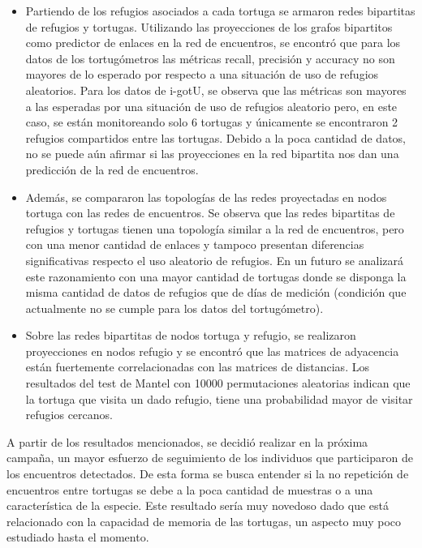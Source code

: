 \begin{itemize}
\item Partiendo de los refugios asociados a cada tortuga se armaron redes bipartitas de refugios y tortugas. Utilizando las proyecciones de los grafos bipartitos como predictor de enlaces en la red de encuentros, se encontró que para los datos de los tortugómetros las métricas recall, precisión y accuracy no son mayores de lo esperado por respecto a una situación de uso de refugios aleatorios. Para los datos de i-gotU, se observa que las métricas son mayores a las esperadas por  una situación de uso de refugios aleatorio pero, en este caso, se están monitoreando solo 6 tortugas y únicamente se encontraron 2 refugios compartidos entre las tortugas. Debido a la poca cantidad de datos, no se puede aún afirmar si las proyecciones en la red bipartita nos dan una predicción de la red de encuentros.
 
\item Además, se compararon las topologías de las redes proyectadas en nodos tortuga con las redes de encuentros. Se observa que las redes bipartitas de refugios y tortugas tienen una topología similar a la red de encuentros, pero con una menor cantidad de enlaces y tampoco presentan diferencias significativas respecto el uso aleatorio de refugios.  En un futuro se analizará este razonamiento con una mayor cantidad de tortugas donde se disponga la misma cantidad de datos de refugios que de días de medición (condición que actualmente no se cumple para los datos del tortugómetro).
 
\item Sobre las redes bipartitas de nodos tortuga y refugio, se realizaron proyecciones en nodos refugio y se encontró que las matrices de adyacencia están fuertemente correlacionadas con las matrices de distancias. Los resultados del test de Mantel con 10000 permutaciones aleatorias indican que la tortuga que visita un dado refugio, tiene una probabilidad mayor de visitar refugios cercanos.
 


\end{itemize}
 
 
 
A partir de los resultados mencionados, se decidió realizar en la próxima campaña, un mayor esfuerzo de seguimiento de los individuos que participaron de los encuentros  detectados. De esta forma se busca entender si la no repetición de encuentros entre tortugas se debe a la poca cantidad de muestras o a una característica de la especie. Este resultado sería muy novedoso dado que está relacionado con la capacidad de memoria de las tortugas, un aspecto muy poco estudiado hasta el momento.
 
